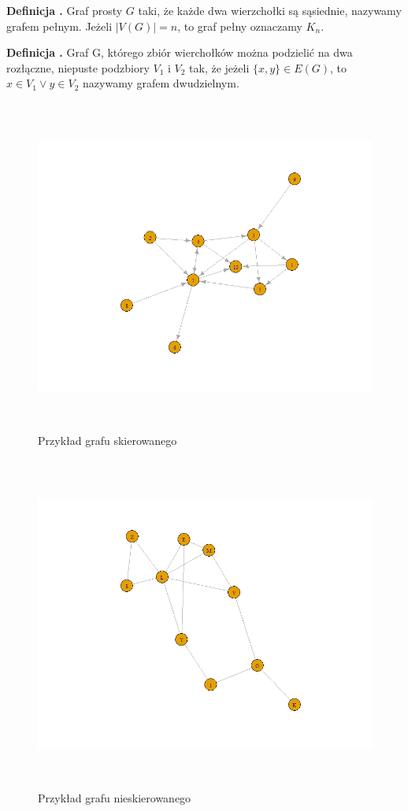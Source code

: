 \noindent
\textbf{Definicja \graphDefinitionIndex.}
\incrementGraphDefinitionIndex
Graf prosty $G$ taki, że każde dwa wierzchołki są sąsiednie, nazywamy grafem pełnym.
Jeżeli $|V(G)| = n$, to graf pełny oznaczamy $K_n$.

\noindent
\textbf{Definicja \graphDefinitionIndex.}
\incrementGraphDefinitionIndex
Graf G, którego zbiór wierchołków można podzielić na dwa rozłączne, niepuste podzbiory $V_1$ i $V_2$ tak,
że jeżeli $\{x, y\} \in E(G)$, to $x \in V_1 \vee y \in V_2$ nazywamy grafem dwudzielnym.

\begin{figure}[ht]
	\centering
	\includegraphics[height=11cm]{partials/images/graph_directed.png}
	\caption{Przykład grafu skierowanego}
	\label{Fig:graphs-undirected-1}
\end{figure}
\FloatBarrier

\begin{figure}[ht]
	\centering
	\includegraphics[height=11cm]{partials/images/graph_undirected.png}
	\caption{Przykład grafu nieskierowanego}
	\label{Fig:graphs-directed-1}
\end{figure}
\FloatBarrier